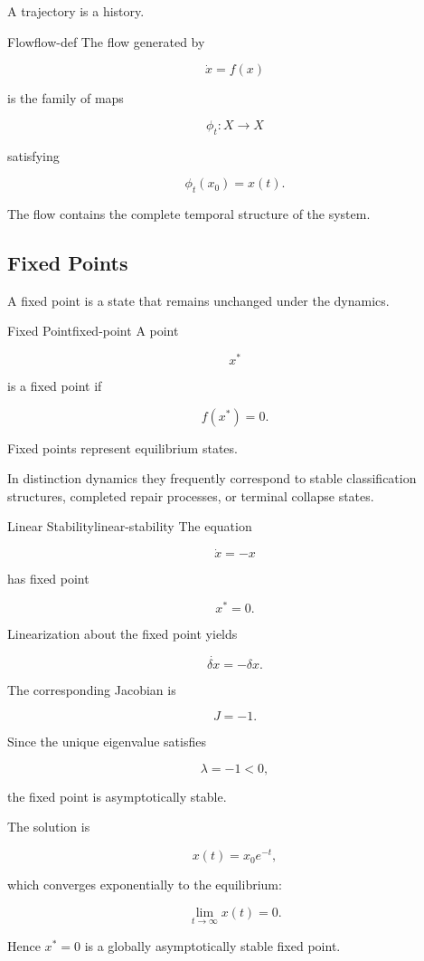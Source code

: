 \documentclass[12pt,twoside,openright]{book}
\begin{document}
A trajectory is a history.

\begin{definition}{Flow}{flow-def}
The flow generated by

\[
\dot x=f(x)
\]

is the family of maps

\[
\phi_t:X\rightarrow X
\]

satisfying

\[
\phi_t(x_0)=x(t).
\]
\end{definition}

The flow contains the complete temporal structure of the
system.

\subsection{Fixed Points}

A fixed point is a state that remains unchanged under the
dynamics.

\begin{definition}{Fixed Point}{fixed-point}
A point

\[
x^*
\]

is a fixed point if

\[
f(x^*)=0.
\]
\end{definition}

Fixed points represent equilibrium states.

In distinction dynamics they frequently correspond to
stable classification structures, completed repair
processes, or terminal collapse states.

\begin{example}{Linear Stability}{linear-stability}
The equation

\[
\dot{x}=-x
\]

has fixed point

\[
x^*=0.
\]

Linearization about the fixed point yields

\[
\dot{\delta x}
=
-\delta x.
\]

The corresponding Jacobian is

\[
J=-1.
\]

Since the unique eigenvalue satisfies

\[
\lambda=-1<0,
\]

the fixed point is asymptotically stable.

The solution is

\[
x(t)
=
x_0 e^{-t},
\]

which converges exponentially to the equilibrium:

\[
\lim_{t\to\infty}x(t)=0.
\]

Hence \(x^*=0\) is a globally asymptotically stable fixed
point.
\end{example}
\end{document}
